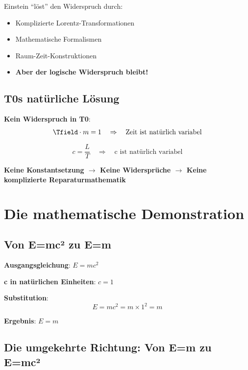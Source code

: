 	Einstein ``löst'' den Widerspruch durch:
	\begin{itemize}
		\item Komplizierte Lorentz-Transformationen
		\item Mathematische Formalismen
		\item Raum-Zeit-Konstruktionen
		\item \textbf{Aber der logische Widerspruch bleibt!}
	\end{itemize}
	
	\subsection{T0s natürliche Lösung}
	
	\textbf{Kein Widerspruch in T0}:
	\begin{equation}
		\Tfield \cdot m = 1 \quad \Rightarrow \quad \text{Zeit ist natürlich variabel}
	\end{equation}
	
	\begin{equation}
		c = \frac{L}{T} \quad \Rightarrow \quad \text{c ist natürlich variabel}
	\end{equation}
	
	\textbf{Keine Konstantsetzung $\rightarrow$ Keine Widersprüche $\rightarrow$ Keine komplizierte Reparaturmathematik}
	
	\section{Die mathematische Demonstration}
	
	\subsection{Von E=mc² zu E=m}
	
	\textbf{Ausgangsgleichung}: $E = mc^2$
	
	\textbf{c in natürlichen Einheiten}: $c = 1$
	
	\textbf{Substitution}:
	\begin{equation}
		E = mc^2 = m \times 1^2 = m
	\end{equation}
	
	\textbf{Ergebnis}: $E = m$
	
	\subsection{Die umgekehrte Richtung: Von E=m zu E=mc²}
	
